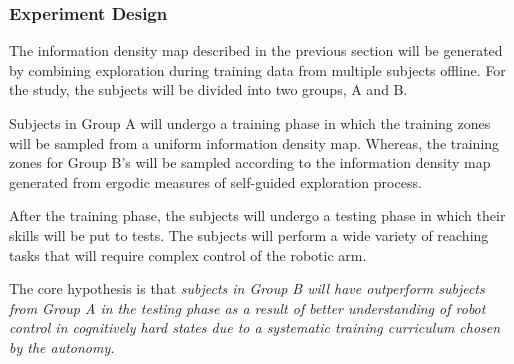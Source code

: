 \documentclass[12pt]{article}
\begin{document}
\subsubsection{Experiment Design}
The information density map described in the previous section will be generated by combining exploration during training data from multiple subjects offline. For the study, the subjects will be divided into two groups, A and B. 

Subjects in Group A will undergo a training phase in which the training zones will be sampled from a uniform information density map. Whereas, the training zones for Group B's will be sampled according to the information density map generated from ergodic measures of self-guided exploration process. 

After the training phase, the subjects will undergo a testing phase in which their skills will be put to tests. The subjects will perform a wide variety of reaching tasks that will require complex control of the robotic arm. 

The core hypothesis is that \textit{subjects in Group B will have outperform subjects from Group A in the testing phase as a result of better understanding of robot control in cognitively hard states due to a systematic training curriculum chosen by the autonomy.}
%
%
%
%
%

\end{document}
